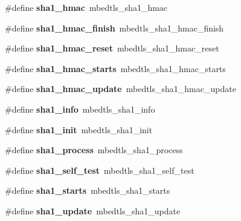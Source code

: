 \begin{DoxyCompactItemize}
\#define {\bfseries sha1\+\_\+hmac}~mbedtls\+\_\+sha1\+\_\+hmac
\item 
\mbox{\label{compat-1_83_8h_a91a2e10f00f5ba06e1bccadefe89224a}} 
\#define {\bfseries sha1\+\_\+hmac\+\_\+finish}~mbedtls\+\_\+sha1\+\_\+hmac\+\_\+finish
\item 
\mbox{\label{compat-1_83_8h_a2a169d68e85b1b00d80135129c750b59}} 
\#define {\bfseries sha1\+\_\+hmac\+\_\+reset}~mbedtls\+\_\+sha1\+\_\+hmac\+\_\+reset
\item 
\mbox{\label{compat-1_83_8h_aba4a4712fca3c10e8e96ab5aa081f34b}} 
\#define {\bfseries sha1\+\_\+hmac\+\_\+starts}~mbedtls\+\_\+sha1\+\_\+hmac\+\_\+starts
\item 
\mbox{\label{compat-1_83_8h_a0eacc03c5583dbf23e32ba0a67284444}} 
\#define {\bfseries sha1\+\_\+hmac\+\_\+update}~mbedtls\+\_\+sha1\+\_\+hmac\+\_\+update
\item 
\mbox{\label{compat-1_83_8h_a776f5eac8f1760fb212f7d302ce4b119}} 
\#define {\bfseries sha1\+\_\+info}~mbedtls\+\_\+sha1\+\_\+info
\item 
\mbox{\label{compat-1_83_8h_a46923d3bec1958241532af5137187510}} 
\#define {\bfseries sha1\+\_\+init}~mbedtls\+\_\+sha1\+\_\+init
\item 
\mbox{\label{compat-1_83_8h_a129a521d36fff73de7749d0b4aeb92b8}} 
\#define {\bfseries sha1\+\_\+process}~mbedtls\+\_\+sha1\+\_\+process
\item 
\mbox{\label{compat-1_83_8h_a4819d2e2dd8f3e879f43f6d45edb1c55}} 
\#define {\bfseries sha1\+\_\+self\+\_\+test}~mbedtls\+\_\+sha1\+\_\+self\+\_\+test
\item 
\mbox{\label{compat-1_83_8h_a6ebc4cb51a64b3c029031729cd2ffd04}} 
\#define {\bfseries sha1\+\_\+starts}~mbedtls\+\_\+sha1\+\_\+starts
\item 
\mbox{\label{compat-1_83_8h_ae663f1b8c73bffe3ae626fd1536f1076}} 
\#define {\bfseries sha1\+\_\+update}~mbedtls\+\_\+sha1\+\_\+update
\item 

\end{DoxyCompactItemize}
